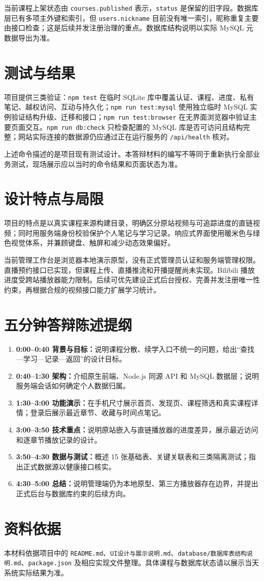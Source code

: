 \documentclass[UTF8,12pt,a4paper]{ctexart}
\begin{document}
当前课程上架状态由 \texttt{courses.published} 表示，\texttt{status} 是保留的旧字段。数据库层已有多项主外键和索引，但 \texttt{users.nickname} 目前没有唯一索引，昵称重复主要由接口检查；这是后续并发注册治理的重点。数据库结构说明以实际 MySQL 元数据导出为准。

\section{测试与结果}
项目提供三类验证：\texttt{npm test} 在临时 SQLite 库中覆盖认证、课程、进度、私有笔记、越权访问、互动与持久化；\texttt{npm run test:mysql} 使用独立临时 MySQL 实例验证结构升级、迁移和接口；\texttt{npm run test:browser} 在无界面浏览器中验证主要页面交互。\texttt{npm run db:check} 只检查配置的 MySQL 库是否可访问且结构完整；网站实际连接的数据源仍应通过正在运行服务的 \texttt{/api/health} 核对。

上述命令描述的是项目现有测试设计。本答辩材料的编写不等同于重新执行全部业务测试，现场展示应以当时的命令结果和页面状态为准。

\section{设计特点与局限}
项目的特点是以真实课程来源构建目录，明确区分原站视频与可追踪进度的直链视频；同时用服务端身份校验保护个人笔记与学习记录。响应式界面使用暖米色与绿色视觉体系，并兼顾键盘、触屏和减少动态效果偏好。

当前管理工作台是浏览器本地演示原型，没有正式管理员认证和服务端管理权限。直播预约接口已实现，但课程上传、直播推流和开播提醒尚未实现。Bilibili 播放进度受跨站播放器能力限制。后续可优先建设正式后台授权、完善并发注册唯一性约束，再根据合规的视频接口能力扩展学习统计。

\section{五分钟答辩陈述提纲}
\begin{enumerate}
\item \textbf{0:00--0:40 背景与目标：}说明课程分散、续学入口不统一的问题，给出“查找—学习—记录—返回”的设计目标。
\item \textbf{0:40--1:30 架构：}介绍原生前端、Node.js 同源 API 和 MySQL 数据层；说明服务端会话如何确定个人数据归属。
\item \textbf{1:30--3:00 功能演示：}在手机尺寸展示首页、发现页、课程筛选和真实课程详情；登录后展示最近章节、收藏与时间点笔记。
\item \textbf{3:00--3:50 技术重点：}说明原站嵌入与直链播放器的进度差异，展示最近访问和逐章节播放记录的设计。
\item \textbf{3:50--4:30 数据与测试：}概述 15 张基础表、关键关联表和三类隔离测试；指出正式数据源以健康接口核实。
\item \textbf{4:30--5:00 总结：}说明管理端仍为本地原型、第三方播放器存在边界，并提出正式后台与数据库约束的后续方向。
\end{enumerate}

\section*{资料依据}
本材料依据项目中的 \texttt{README.md}、\texttt{UI设计与展示说明.md}、\texttt{database/数据库表结构说明.md}、\texttt{package.json} 及相应实现文件整理。具体课程与数据库状态请以展示当天系统实际结果为准。
\end{document}
